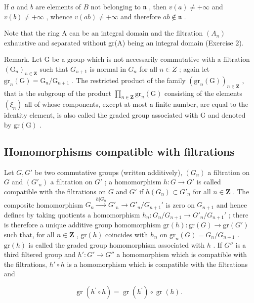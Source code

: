 If \(a\) and \(b\) are elements of \(B\) not belonging to \(\mathfrak{n}\) , then \(v(a) \neq +\infty\) and \(v(b) \neq +\infty\) , whence \(v(ab) \neq +\infty\) and therefore \(ab \notin \mathfrak{n}\) .

Note that the ring A can be an integral domain and the filtration \((A_{n})\) exhaustive and separated without gr(A) being an integral domain (Exercise 2).

Remark. Let G be a group which is not necessarily commutative with a filtration \((\mathrm{G}_{n})_{n\in\mathbf{Z}}\) such that \(G_{n+1}\) is normal in \(G_{n}\) for all \(n\in Z\) ; again let \(\mathrm{gr}_{n}(\mathrm{G})=\mathrm{G}_{n}/\mathrm{G}_{n+1}\) . The restricted product of the family \((\mathrm{gr}_{n}(\mathrm{G}))_{n\in\mathbf{Z}}\) , that is the subgroup of the product \(\prod_{n\in\mathbf{Z}}\mathrm{gr}_{n}(\mathrm{G})\) consisting of the elements \((\xi_{n})\) all of whose components, except at most a finite number, are equal to the identity element, is also called the graded group associated with G and denoted by \(\mathrm{gr}(\mathrm{G})\) .

\subsection{Homomorphisms compatible with filtrations}

Let \(G, G'\) be two commutative groups (written additively), \((G_n)\) a filtration on \(G\) and \((G'_n)\) a filtration on \(G'\) ; a homomorphism \(h: G \to G'\) is called compatible with the filtrations on \(G\) and \(G'\) if \(h(G_n) \subset G'_n\) for all \(n \in \mathbf{Z}\) . The composite homomorphism \(G_n \xrightarrow{h|G_n} G'_n \longrightarrow G'_n / G_{n+1}'\) is zero on \(G_{n+1}\) and hence defines by taking quotients a homomorphism \(h_n: G_n / G_{n+1} \to G'_n / G_{n+1}'\) ; there is therefore a unique additive group homomorphism \(\text{gr}(h): \text{gr}(G) \to \text{gr}(G')\) such that, for all \(n \in \mathbf{Z}\) , \(\text{gr}(h)\) coincides with \(h_n\) on \(\text{gr}_n(G) = G_n / G_{n+1}\) . \(\text{gr}(h)\) is called the graded group homomorphism associated with \(h\) . If \(G''\) is a third filtered group and \(h': G' \to G''\) a homomorphism which is compatible with the filtrations, \(h' \circ h\) is a homomorphism which is compatible with the filtrations and

\[
\operatorname{gr} (h ^ {\prime} \circ h) = \operatorname{gr} (h ^ {\prime}) \circ \operatorname{gr} (h).\tag{12}
\]

